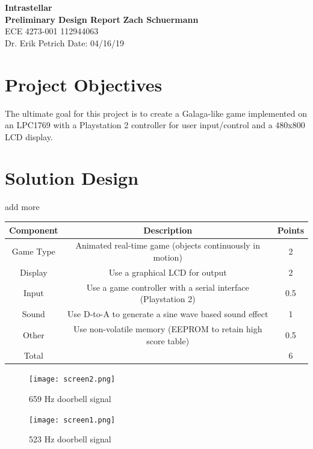 \documentclass[a4paper, 12pt]{article}
\begin{document}
\noindent
\LARGE\textbf{Intrastellar} \hfill \\
\newline
\large\textbf{Preliminary Design Report} \hfill \textbf{Zach Schuermann} \\
\normalsize ECE 4273-001 \hfill 112944063 \\
Dr. Erik Petrich \hfill Date: 04/16/19 

\section*{Project Objectives}
The ultimate goal for this project is to create a Galaga-like game implemented on an LPC1769 with a Playstation 2 controller for user input/control and a 480x800 LCD display.

\section*{Solution Design}
add more

\begin{center}
  \begin{tabular}{ |c|c|c| }
    \hline
    \textbf{Component} & \textbf{Description} & \textbf{Points} \\
    \hline
    \hline
    Game Type & Animated real-time game (objects continuously in motion) & 2 \\
    \hline
    Display & Use a graphical LCD for output  & 2 \\
    \hline
    Input & Use a game controller with a serial interface (Playstation 2) & 0.5 \\ 
    \hline
    Sound & Use D-to-A to generate a sine wave based sound effect  & 1 \\
    \hline
    Other & Use non-volatile memory (EEPROM  to retain high score table) & 0.5 \\ 
    \hline
    Total & & 6 \\ 
    \hline
  \end{tabular}
\end{center}

\begin{figure}[h!]
  \centering
  \texttt{[image: screen2.png]}
  \caption{659 Hz doorbell signal}
  \label{fig:screen1}
\end{figure}

\begin{figure}[h!]
  \centering
  \texttt{[image: screen1.png]}
  \caption{523 Hz doorbell signal}
  \label{fig:screen2}
\end{figure}
\end{document}
